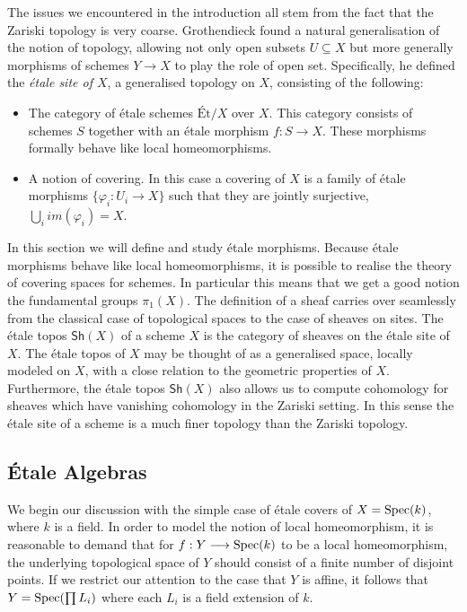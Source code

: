The issues we encountered in the introduction all stem from the fact that the Zariski topology is very coarse. Grothendieck found a natural generalisation of the notion of topology, allowing not only open subsets $U \subseteq X$ but more generally morphisms of schemes $Y \to X$ to play the role of open set. Specifically, he defined the \textit{\'etale site of $X$}, a generalised topology on $X$, consisting of the following:

\begin{itemize}
  \item The category of \'etale schemes $\text{\'Et}/X$ over $X$. This category consists of schemes $S$ together with an \'etale morphism $f: S \to X$. These morphisms formally behave like local homeomorphisms. 
  \item A notion of covering. In this case a covering of $X$ is a family of \'etale morphisms $\{\varphi_i: U_i \to X\}$ such that they are jointly surjective, $\bigcup_i im(\varphi_i) = X$. 
\end{itemize}

In this section we will define and study \'etale morphisms.  Because \'etale morphisms behave like local homeomorphisms, it is possible to realise the theory of covering spaces for schemes. In particular this means that we get a good notion the fundamental groups $\pi_1(X)$. The definition of a sheaf carries over seamlessly from the classical case of topological spaces to the case of sheaves on sites. The \'etale topos $\mathsf{Sh}(X)$ of a scheme $X$ is the category of sheaves on the \'etale site of $X$.  The \'etale topos of $X$ may be thought of as a generalised space, locally modeled on $X$, with a close relation to the geometric properties of $X$.  Furthermore, the \'etale topos $\mathsf{Sh}(X)$ also allows us to compute cohomology for sheaves which have vanishing cohomology in the Zariski setting. In this sense the \'etale site of a scheme is a much finer topology than the Zariski topology.

\subsection{\'Etale Algebras}
We begin our discussion with the simple case of \'etale covers of $X = \operatorname{Spec}(k)$, where $k$ is a field. In order to model the notion of local homeomorphism, it is reasonable to demand that for $f: Y \longrightarrow \operatorname{Spec}(k)$ to be a local homeomorphism,  the underlying topological space of $Y$ should consist of a finite number of disjoint points. If we restrict our attention to the case that $Y$ is affine, it follows that $Y = \operatorname{Spec}(\prod L_i)$ where each $L_i$ is a field extension of $k$. 

